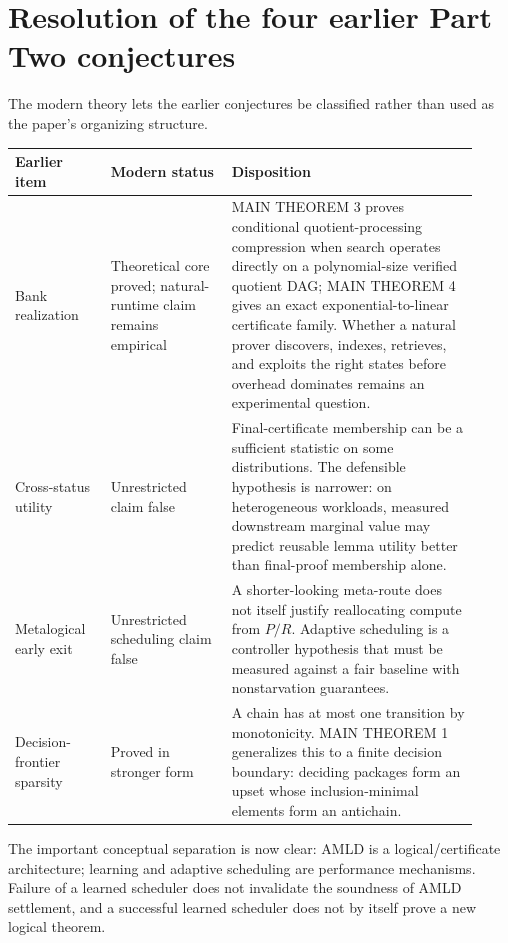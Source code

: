 \documentclass[11pt]{article}
\theoremstyle{remark}
\begin{document}
\section{Resolution of the four earlier Part Two conjectures}

The modern theory lets the earlier conjectures be classified rather than used as the paper's organizing structure.

\begin{longtable}{>{\raggedright\arraybackslash}p{0.19\linewidth}>{\raggedright\arraybackslash}p{0.24\linewidth}>{\raggedright\arraybackslash}p{0.49\linewidth}}
\toprule
Earlier item & Modern status & Disposition \\
\midrule
\endhead
Bank realization & Theoretical core proved; natural-runtime claim remains empirical & MAIN THEOREM 3 proves conditional quotient-processing compression when search operates directly on a polynomial-size verified quotient DAG; MAIN THEOREM 4 gives an exact exponential-to-linear certificate family. Whether a natural prover discovers, indexes, retrieves, and exploits the right states before overhead dominates remains an experimental question. \\
\addlinespace
Cross-status utility & Unrestricted claim false & Final-certificate membership can be a sufficient statistic on some distributions. The defensible hypothesis is narrower: on heterogeneous workloads, measured downstream marginal value may predict reusable lemma utility better than final-proof membership alone. \\
\addlinespace
Metalogical early exit & Unrestricted scheduling claim false & A shorter-looking meta-route does not itself justify reallocating compute from $P/R$. Adaptive scheduling is a controller hypothesis that must be measured against a fair baseline with nonstarvation guarantees. \\
\addlinespace
Decision-frontier sparsity & Proved in stronger form & A chain has at most one transition by monotonicity. MAIN THEOREM 1 generalizes this to a finite decision boundary: deciding packages form an upset whose inclusion-minimal elements form an antichain. \\
\bottomrule
\end{longtable}

The important conceptual separation is now clear: AMLD is a logical/certificate architecture; learning and adaptive scheduling are performance mechanisms. Failure of a learned scheduler does not invalidate the soundness of AMLD settlement, and a successful learned scheduler does not by itself prove a new logical theorem.
\end{document}
